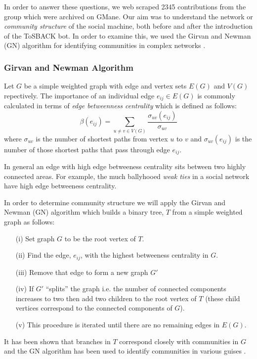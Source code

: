 \documentclass{sig-alternate}
\begin{document}
In order to answer these questions, we web scraped 2345 contributions from the group which were archived on GMane. Our aim was to understand the network or \emph{community structure} of the social machine, both before and after the introduction of the ToSBACK bot. In order to examine this, we used the Girvan and Newman (GN) algorithm for identifying communities in complex networks \cite{gnm:comm}.

\subsubsection{Girvan and Newman Algorithm}

Let $G$ be a simple weighted graph  with edge and vertex sets $E(G)$ and $V(G)$  repectively.  The importance of an individual edge $e_{ij} \in E(G)$ is commonly calculated in terms of \emph{edge betweenness centrality} which is defined as follows:
\[\beta(e_{ij}) = \sum_{ u\neq v \in V(G)} \frac{\sigma_{uv}(e_{ij})}{\sigma_{uv}}\]
where $\sigma_{uv}$ is the number of shortest paths from vertex $u$ to $v$ and $\sigma_{uv}(e_{ij})$ is the number of those shortest paths that pass through edge $e_{ij}$.  

In general an edge with high edge betweeness centrality sits between two highly connected areas.  For example, the much ballyhooed \emph{weak ties} in a social network have high edge betweeness centrality.

In order to determine community structure we will apply the Girvan and Newman (GN) algorithm \cite{gnm:comm} which builds a binary tree, $T$ from a simple weighted graph as follows: 
\begin{itemize}
\item[(i)] Set graph $G$ to be the root vertex of $T$.
 \item[(ii)] Find the edge, $e_{ij}$, with the highest betweeness centrality in $G$.
 \item[(iii)] Remove that edge to form  a new graph $G'$
 \item[(iv)] If $G'$ ``splits'' the graph i.e. the number of connected components increases to two then add two children to the root vertex of $T$ (these child vertices correspond to the connected components of $G$).
 \item[(v)] This procedure is iterated until there are no remaining edges in $E(G)$.
\end{itemize}

It has been shown \cite{gnm:comm} that branches in $T$ correspond closely with communities in $G$ and the GN algorithm has been used to identify communities in various guises \cite{guimera:comm}.
\end{document}
